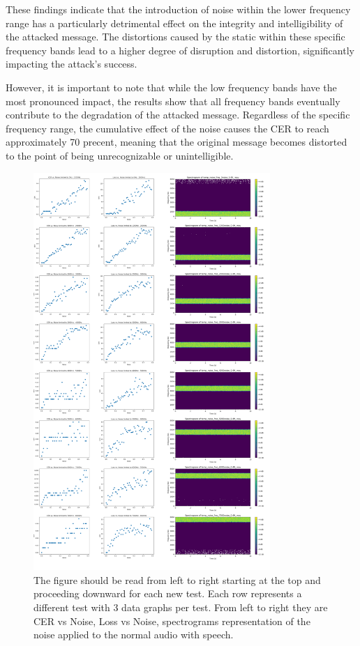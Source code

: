 \documentclass[11pt,a4paper]{article}
\begin{document}
These findings indicate that the introduction of noise within the lower
frequency range has a particularly detrimental effect on the integrity and
intelligibility of the attacked message. The distortions caused by the static
within these specific frequency bands lead to a higher degree of disruption and
distortion, significantly impacting the attack's success.

However, it is important to note that while the low frequency bands have the
most pronounced impact, the results show that all frequency bands eventually
contribute to the degradation of the attacked message. Regardless of the
specific frequency range, the cumulative effect of the noise causes the CER to
reach approximately 70 precent, meaning that the original message becomes
distorted to the point of being unrecognizable or unintelligible.

\begin{figure}
  \centering
  \includegraphics[width=0.8\textwidth]{images/WaveBandTestingRegularAudio.png}
  \caption{The figure should be read from left to right starting at the top and proceeding downward for each new test. Each row represents a different test with 3 data graphs per test. From left to right they are CER vs Noise, Loss vs Noise, spectrograms representation of the noise applied to the normal audio with speech.}
  \label{fig:WaveBandTestingRegularAudio}
\end{figure}
\end{document}
